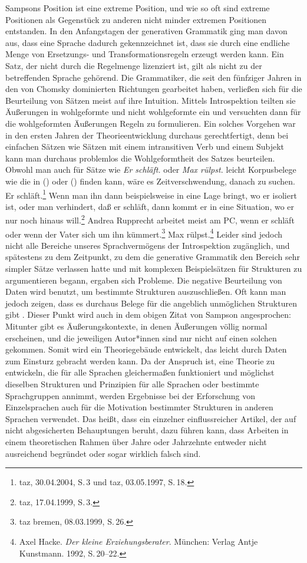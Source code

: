 Sampsons Position ist eine extreme Position, und wie so oft sind extreme Positionen als Gegenstück
zu anderen nicht minder extremen Positionen entstanden. In den Anfangstagen der generativen Grammatik ging man davon aus,
dass eine Sprache dadurch gekennzeichnet ist, dass sie durch eine endliche Menge von Ersetzungs- und
Transformationsregeln erzeugt werden kann. Ein Satz, der nicht durch die Regelmenge lizenziert ist,
gilt als nicht zu der betreffenden Sprache gehörend. Die Grammatiker, die
seit den fünfziger Jahren in den von Chomsky dominierten Richtungen gearbeitet haben, verließen
sich für die Beurteilung von Sätzen meist auf ihre Intuition. Mittels Introspektion teilten sie
Äußerungen in wohlgeformte und nicht wohlgeformte ein und versuchten dann für die wohlgeformten
Äußerungen Regeln zu formulieren. Ein solches Vorgehen war in den ersten Jahren der Theorieentwicklung
durchaus gerechtfertigt, denn bei einfachen Sätzen wie \zb Sätzen mit einem intransitiven Verb
und einem Subjekt kann man durchaus problemlos die Wohlgeformtheit des Satzes beurteilen.
Obwohl man auch für Sätze wie \emph{Er schläft.} oder \emph{Max rülpst.} leicht Korpusbelege
wie die in () oder () finden kann, wäre es Zeitverschwendung, danach zu suchen.
\eal
\ex Er schläft.\footnote{
  taz, 30.04.2004, S.\,3 und taz, 03.05.1997, S.\,18.
}
\ex Wenn man ihn dann beispielsweise in eine Lage bringt, wo er isoliert ist, oder man verhindert, 
    daß er schläft, dann kommt er in eine Situation, wo er nur noch hinaus will.\footnote{
  taz, 17.04.1999, S.\,3.
}
\ex Andrea Rupprecht arbeitet meist am PC, wenn er schläft oder wenn der Vater sich um ihn kümmert.\footnote{
  taz bremen,  08.03.1999, S.\,26.
}
\zl
\ea
Max rülpst.\footnote{
  Axel Hacke. \emph{Der kleine Erziehungsberater}. München: Verlag Antje Kunstmann. 1992, S.\,20--22.%
}
\z
Leider sind jedoch nicht alle Bereiche unseres Sprachvermögens der Introspektion zugänglich, und
spätestens zu dem Zeitpunkt, zu dem die generative Grammatik den Bereich sehr simpler Sätze verlassen
hatte und mit komplexen Beispielsätzen für Strukturen zu argumentieren begann, ergaben sich Probleme.
Die negative Beurteilung von Daten wird benutzt, um bestimmte Strukturen auszuschließen. Oft kann man
jedoch zeigen, dass es durchaus Belege für die angeblich unmöglichen Strukturen gibt \citep[siehe auch][]{Mueller2007c,MM2009a}.
Dieser Punkt wird auch in dem obigen Zitat von Sampson angesprochen: Mitunter gibt es Äußerungskontexte, in denen
Äußerungen völlig normal erscheinen, und die jeweiligen Autor*innen sind nur nicht auf einen solchen gekommen.
Somit wird ein Theoriegebäude entwickelt, das leicht durch Daten zum Einsturz gebracht werden kann.
Da der Anspruch ist, eine Theorie zu entwickeln, die für alle Sprachen gleichermaßen funktioniert
und möglichst dieselben Strukturen und Prinzipien für alle Sprachen oder bestimmte Sprachgruppen
annimmt, werden Ergebnisse bei der Erforschung von Einzelsprachen auch für die Motivation
bestimmter Strukturen in anderen Sprachen verwendet. Das heißt, dass ein einzelner einflussreicher
Artikel, der auf nicht abgesicherten Behauptungen beruht, dazu führen kann, dass Arbeiten
in einem theoretischen Rahmen über Jahre oder Jahrzehnte entweder nicht ausreichend begründet 
oder sogar wirklich falsch sind.

